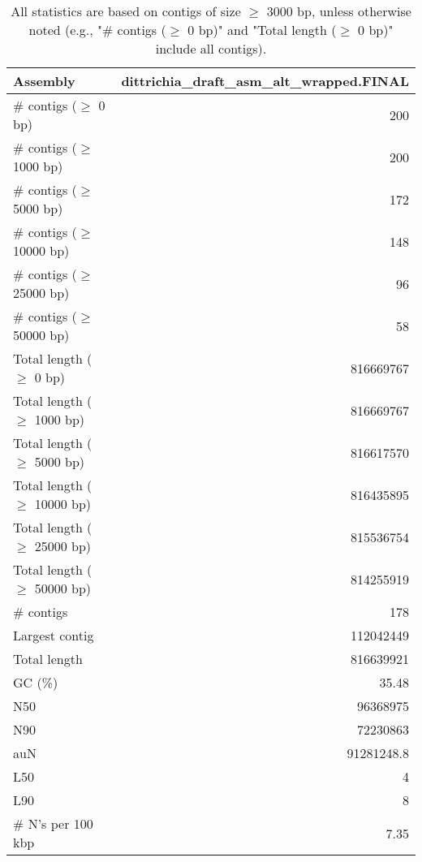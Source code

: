 \documentclass[12pt,a4paper]{article}
\begin{document}
\begin{table}[ht]
\begin{center}
\caption{All statistics are based on contigs of size $\geq$ 3000 bp, unless otherwise noted (e.g., "\# contigs ($\geq$ 0 bp)" and "Total length ($\geq$ 0 bp)" include all contigs).}
\begin{tabular}{|l*{1}{|r}|}
\hline
Assembly & dittrichia\_draft\_asm\_alt\_wrapped.FINAL \\ \hline
\# contigs ($\geq$ 0 bp) & 200 \\ \hline
\# contigs ($\geq$ 1000 bp) & 200 \\ \hline
\# contigs ($\geq$ 5000 bp) & 172 \\ \hline
\# contigs ($\geq$ 10000 bp) & 148 \\ \hline
\# contigs ($\geq$ 25000 bp) & 96 \\ \hline
\# contigs ($\geq$ 50000 bp) & 58 \\ \hline
Total length ($\geq$ 0 bp) & 816669767 \\ \hline
Total length ($\geq$ 1000 bp) & 816669767 \\ \hline
Total length ($\geq$ 5000 bp) & 816617570 \\ \hline
Total length ($\geq$ 10000 bp) & 816435895 \\ \hline
Total length ($\geq$ 25000 bp) & 815536754 \\ \hline
Total length ($\geq$ 50000 bp) & 814255919 \\ \hline
\# contigs & 178 \\ \hline
Largest contig & 112042449 \\ \hline
Total length & 816639921 \\ \hline
GC (\%) & 35.48 \\ \hline
N50 & 96368975 \\ \hline
N90 & 72230863 \\ \hline
auN & 91281248.8 \\ \hline
L50 & 4 \\ \hline
L90 & 8 \\ \hline
\# N's per 100 kbp & 7.35 \\ \hline
\end{tabular}
\end{center}
\end{table}
\end{document}
